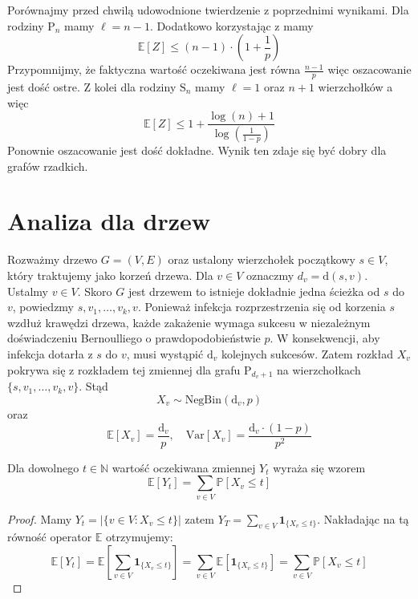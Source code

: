 Porównajmy przed chwilą udowodnione twierdzenie z poprzednimi wynikami. Dla rodziny $\mathrm{P}_n$ mamy $\ell = n - 1$. Dodatkowo korzystając z  mamy
\[
    \mathbb{E}[Z] \le (n-1) \cdot \left(1 + \frac{1}{p} \right)
\]
Przypomnijmy, że faktyczna wartość oczekiwana jest równa $\frac{n-1}{p}$ więc oszacowanie jest dość ostre. Z kolei dla rodziny $\mathrm{S}_n$ mamy $\ell=1$ oraz $n+1$ wierzchołków a więc
\[
    \mathbb{E}[Z] \le 1 + \frac{\log(n) + 1}{\log(\frac{1}{1-p})}
\]
Ponownie oszacowanie jest dość dokładne. Wynik ten zdaje się być dobry dla grafów rzadkich.


\section{Analiza dla drzew}

Rozważmy drzewo $G = (V, E)$ oraz ustalony wierzchołek początkowy $s \in V$, 
który traktujemy jako korzeń drzewa. Dla $v\in V$ oznaczmy  $d_v=\mathrm{d}(s,v)$. Ustalmy $v\in V$. Skoro $G$ jest drzewem to istnieje dokładnie jedna ścieżka od $s$ do $v$, powiedzmy $s,v_1,\dots,v_k, v$. Ponieważ infekcja rozprzestrzenia się od korzenia $s$ wzdłuż krawędzi drzewa, 
każde zakażenie wymaga sukcesu w niezależnym doświadczeniu Bernoulliego o prawdopodobieństwie $p$.
W konsekwencji, aby infekcja dotarła z $s$ do $v$, 
musi wystąpić $\mathrm{d}_v$ kolejnych sukcesów. Zatem rozkład $X_v$ pokrywa się z rozkładem tej zmiennej dla grafu $\mathrm{P}_{d_v+1}$ na wierzchołkach $\{s,v_1,\dots,v_k, v\}$. Stąd 
\[
    X_v\sim \mathrm{NegBin}(\mathrm{d}_v,p)
\]
oraz
\[
    \mathbb{E}[X_v] = \frac{\mathrm{d}_v}{p}, \quad \mathrm{Var}[X_v] = \frac{\mathrm{d}_v\cdot(1 - p)}{p^2}
\]
\begin{lemma}\label{L:Formula_EYt}
Dla dowolnego $t\in\mathbb{N}$ wartość oczekiwana zmiennej $Y_t$ wyraża się wzorem
\[
    \mathbb{E}[Y_t] = \sum_{v\in V} \mathbb{P}[X_v \le t]
\]    
\end{lemma}

\begin{proof}
Mamy $Y_t=|\{v\in V: X_v \le t\}|$ zatem $Y_T=\sum_{v\in V}  \mathbf{1}_{\{X_v\le t\}}$. Nakładając na tą równość operator $\mathbb{E}$ otrzymujemy:
\[
    \mathbb{E}[Y_t] = \mathbb{E}\left[ \sum_{v\in V}  \mathbf{1}_{\{X_v\le t\}}\right]= \sum_{v\in V} \mathbb{E}[\mathbf{1}_{\{X_v\le t\}}] = \sum_{v\in V} \mathbb{P}[X_v \le t]
\]    
\end{proof}

